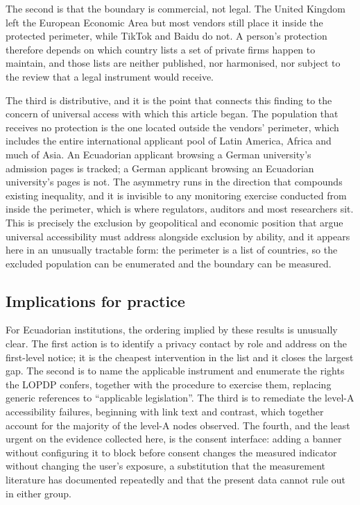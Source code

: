\documentclass[pdflatex,sn-basic,Numbered,iicol]{sn-jnl}
\theoremstyle{thmstyleone}
\theoremstyle{thmstyletwo}
\theoremstyle{thmstylethree}
\begin{document}
	The second is that the boundary is commercial, not legal. The United Kingdom left the European Economic Area but most vendors still place it inside the protected perimeter, while TikTok and Baidu do not. A person's protection therefore depends on which country lists a set of private firms happen to maintain, and those lists are neither published, nor harmonised, nor subject to the review that a legal instrument would receive.
	
	The third is distributive, and it is the point that connects this finding to the concern of universal access with which this article began. The population that receives no protection is the one located outside the vendors' perimeter, which includes the entire international applicant pool of Latin America, Africa and much of Asia. An Ecuadorian applicant browsing a German university's admission pages is tracked; a German applicant browsing an Ecuadorian university's pages is not. The asymmetry runs in the direction that compounds existing inequality, and it is invisible to any monitoring exercise conducted from inside the perimeter, which is where regulators, auditors and most researchers sit. This is precisely the exclusion by geopolitical and economic position that \citet{abascal2016rethinking} argue universal accessibility must address alongside exclusion by ability, and it appears here in an unusually tractable form: the perimeter is a list of countries, so the excluded population can be enumerated and the boundary can be measured.
	
	\subsection{Implications for practice}\label{sec:discussion-practice}
	
	For Ecuadorian institutions, the ordering implied by these results is unusually clear. The first action is to identify a privacy contact by role and address on the first-level notice; it is the cheapest intervention in the list and it closes the largest gap. The second is to name the applicable instrument and enumerate the rights the LOPDP confers, together with the procedure to exercise them, replacing generic references to ``applicable legislation''. The third is to remediate the level-A accessibility failures, beginning with link text and contrast, which together account for the majority of the level-A nodes observed. The fourth, and the least urgent on the evidence collected here, is the consent interface: adding a banner without configuring it to block before consent changes the measured indicator without changing the user's exposure, a substitution that the measurement literature has documented repeatedly \citep{sanchezrola2019can,bollinger2022automating} and that the present data cannot rule out in either group.
	
\end{document}
